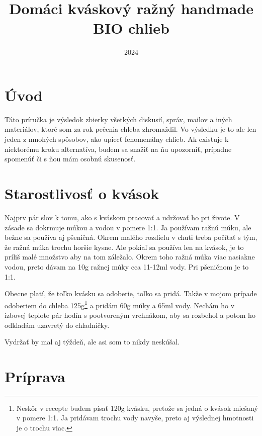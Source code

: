 \documentclass[a4paper,12pt]{article}
\title{Domáci kváskový ražný handmade BIO chlieb}
\date{2024}
\begin{document}
\maketitle


\section{Úvod}
Táto príručka je výsledok zbierky všetkých diskusií, správ, mailov a iných materiálov, ktoré som za rok pečenia chleba zhromaždil. Vo výsledku je to ale len jeden z mnohých spôsobov, ako upiecť fenomenálny chlieb. Ak existuje k niektorému kroku alternatíva, budem sa snažiť na ňu upozorniť, prípadne spomenúť či s ňou mám osobnú skusenosť.

\section{Starostlivosť o kvások}
Najprv pár slov k tomu, ako s kváskom pracovať a udržovať ho pri živote. V zásade sa dokrmuje múkou a vodou v pomere 1:1. Ja používam ražnú múku, ale bežne sa používa aj pšeničná. Okrem malého rozdielu v chuti treba počítať s tým, že ražná múka trochu horšie kysne. Ale pokiaľ sa používa len na kvások, je to príliš malé množstvo aby na tom záležalo. Okrem toho ražná múka viac nasiakne vodou, preto dávam na 10g ražnej múky cca 11-12ml vody. Pri pšeničnom je to 1:1.

Obecne platí, že toľko kvásku sa odoberie, toľko sa pridá. Takže v mojom prípade odoberiem do chleba 125g\footnote{Neskôr v recepte budem písať 120g kvásku, pretože sa jedná o kvások miešaný v pomere 1:1. Ja pridávam trochu vody navyše, preto aj výslednej hmotnosti je o trochu viac.} a pridám 60g múky a 65ml vody. Nechám ho v izbovej teplote pár hodín s pootvoreným vrchnákom, aby sa rozbehol a potom ho odkladám uzavretý do chladničky.

Vydržať by mal aj týždeň, ale asi som to nikdy neskúšal.

\section{Príprava}
\end{document}

